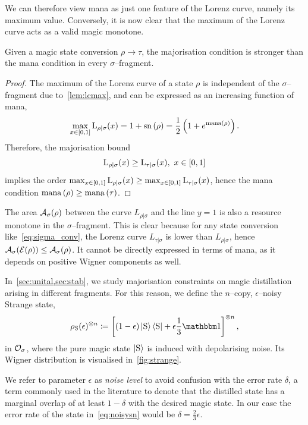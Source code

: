 \documentclass[pra,
aps,
twocolumn,
superscriptaddress,
groupedaddress,
nofootinbib,
reprint
]{revtex4-1}
\begin{document}
We can therefore view mana as just one feature of the Lorenz curve, namely its maximum value. 
Conversely, it is now clear that the maximum of the Lorenz curve acts as a valid magic monotone.
\begin{theorem}\label{thm:bounds}
    Given a magic state conversion $\rho \longrightarrow \tau$, the majorisation condition is stronger than the mana condition in every $\sigma$--fragment.
\end{theorem}
\begin{proof}
    The maximum of the Lorenz curve of a state $\rho$ is independent of the $\sigma$--fragment due to~\cref{lem:lcmax}, and can be expressed as an increasing function of mana,
    \begin{equation}
        \max_{x\in[0,1]}{{{\rm{L}}_{\rho|\sigma}}(x)} = 1 + {{\rm{sn}}\left(\rho\right)} = \frac{1}{2} \left( 1 + e^{{\rm{mana}}\left(\rho\right)} \right).
    \end{equation}
    Therefore, the majorisation bound
    \begin{equation}
    	\lc{\rho}{\sigma}(x) \geq \lc{\tau}{\sigma}(x),\ x\in[0,1]
    \end{equation}
    implies the order $\max_{x\in[0,1]}{{{\rm{L}}_{\rho|\sigma}}(x)} \geq \max_{x\in[0,1]}{{{\rm{L}}_{\tau|\sigma}}(x)}$, hence the mana condition ${{\rm{mana}}\left(\rho\right)} \geq {{\rm{mana}}\left(\tau\right)}$.
\end{proof}

The area ${\mathcal A}_\sigma(\rho)$ between the curve $L_{\rho|\sigma}$ and the line $y=1$ is also a resource monotone in the $\sigma$--fragment. 
This is clear because for any state conversion like~\cref{eq:sigma_conv}, the Lorenz curve $L_{\tau|\sigma}$ is lower than $L_{\rho|\sigma}$, hence ${\mathcal A}_\sigma(\mathcal{E}(\rho)) \leq {\mathcal A}_\sigma(\rho)$.
It cannot be directly expressed in terms of mana, as it depends on positive Wigner components as well.

In~\cref{sec:unital,sec:stab}, we study majorisation constraints on magic distillation arising in different fragments. 
For this reason, we define the $n$--copy, $\epsilon$--noisy Strange state,
\begin{equation}\label{eq:noisysn}
    \rho_{\rm{S}}(\epsilon)^{\otimes n} \coloneqq \left[ (1 - \epsilon) \ket{\rm{S}}\bra{\rm{S}} + \epsilon \frac{1}{3}\id \right]^{\otimes n},
\end{equation}
in $\mathcal{O}_\sigma$, where the pure magic state $\ket{\rm{S}}$ is induced with depolarising noise. 
Its Wigner distribution is visualised in~\cref{fig:strange}.

We refer to parameter $\epsilon$ as \emph{noise level} to avoid confusion with the error rate $\delta$, a term commonly used in the literature to denote that the distilled state has a marginal overlap of at least $1-\delta$ with the desired magic state.
In our case the error rate of the state in~\cref{eq:noisysn} would be $\delta = \frac{2}{3}\epsilon$.
\end{document}
